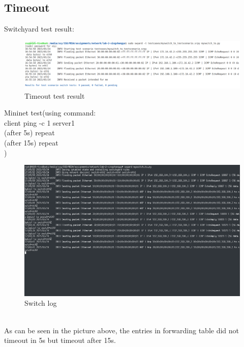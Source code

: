 \documentclass[12pt,a4paper,UTF8]{article}
\begin{document}
\subsection{Timeout}
Switchyard test result:
\begin{figure}[htbp]
	\centering
	\includegraphics[width=\textwidth]{to_test}
	\caption{Timeout test result}
\end{figure}
\newpage
Mininet test(using command: \\ client ping -c 1 server1 \\ (after 5s) repeat \\ (after 15s) repeat \\ )
\begin{figure}[htbp]
	\centering
	\includegraphics[width=\textwidth]{to_mininet}
	\caption{Switch log}
\end{figure}
\\ As can be seen in the picture above, the entries in forwarding table did not timeout in 5s but timeout after 15s.
\end{document}

